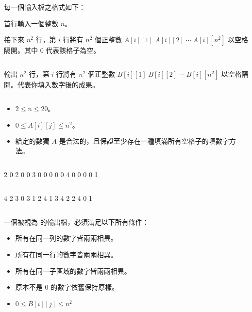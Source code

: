 每一個輸入檔之格式如下：

首行輸入一個整數 $n$。

接下來 $n^2$ 行，第 $i$ 行將有 $n^2$ 個正整數 $A[i][1]\;A[i][2]\;\cdots\;A[i][n^2]$ 以空格隔開。其中 $0$ 代表該格子為空。

\subsection*{}

輸出 $n^2$ 行，第 $i$ 行將有 $n^2$ 個正整數 $B[i][1]\;B[i][2]\;\cdots\;B[i][n^2]$ 以空格隔開。代表你填入數字後的成果。

\subsection*{}

\begin{itemize}
    \item $2\le n\le 20$。
    \item $0\le A[i][j]\le n^2$。
    \item 給定的數獨 $A$ 是合法的，且保證至少存在一種填滿所有空格子的填數字方法。
\end{itemize}

\subsection*{}

\begin{tests}
2
0 2 0 0
3 0 0 0
0 0 4 0
0 0 0 1
\end{tests}

\subsection*{}

\begin{tests}
4 2 3 0
3 1 2 4
1 3 4 2
2 4 0 1
\end{tests}

\subsection*{}

一個被視為  的輸出檔，必須滿足以下所有條件：

\begin{itemize}
    \item 所有在同一列的數字皆兩兩相異。
    \item 所有在同一行的數字皆兩兩相異。
    \item 所有在同一子區域的數字皆兩兩相異。
    \item 原本不是 $0$ 的數字依舊保持原樣。
    \item $0\le B[i][j]\le n^2$
\end{itemize}

